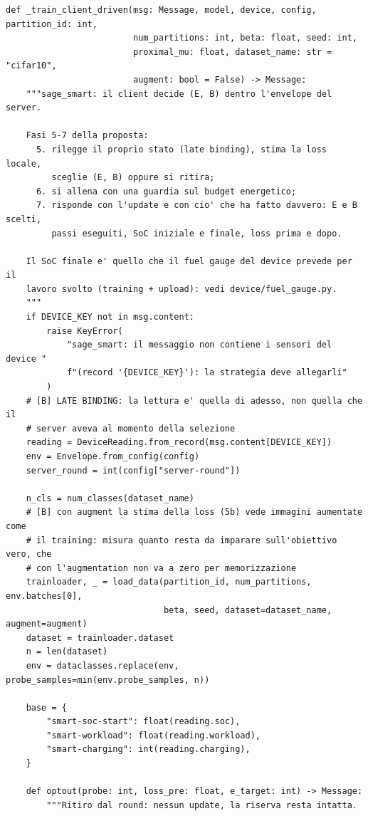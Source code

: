 \documentclass[11pt,a4paper]{article}
\begin{document}
\begin{lstlisting}[style=py,firstnumber=141,caption={\texttt{tesifl/tesiFL/client\_app.py}, lines 141--276}]
def _train_client_driven(msg: Message, model, device, config, partition_id: int,
                         num_partitions: int, beta: float, seed: int,
                         proximal_mu: float, dataset_name: str = "cifar10",
                         augment: bool = False) -> Message:
    """sage_smart: il client decide (E, B) dentro l'envelope del server.

    Fasi 5-7 della proposta:
      5. rilegge il proprio stato (late binding), stima la loss locale,
         sceglie (E, B) oppure si ritira;
      6. si allena con una guardia sul budget energetico;
      7. risponde con l'update e con cio' che ha fatto davvero: E e B scelti,
         passi eseguiti, SoC iniziale e finale, loss prima e dopo.

    Il SoC finale e' quello che il fuel gauge del device prevede per il
    lavoro svolto (training + upload): vedi device/fuel_gauge.py.
    """
    if DEVICE_KEY not in msg.content:
        raise KeyError(
            "sage_smart: il messaggio non contiene i sensori del device "
            f"(record '{DEVICE_KEY}'): la strategia deve allegarli"
        )
    # [B] LATE BINDING: la lettura e' quella di adesso, non quella che il
    # server aveva al momento della selezione
    reading = DeviceReading.from_record(msg.content[DEVICE_KEY])
    env = Envelope.from_config(config)
    server_round = int(config["server-round"])

    n_cls = num_classes(dataset_name)
    # [B] con augment la stima della loss (5b) vede immagini aumentate come
    # il training: misura quanto resta da imparare sull'obiettivo vero, che
    # con l'augmentation non va a zero per memorizzazione
    trainloader, _ = load_data(partition_id, num_partitions, env.batches[0],
                               beta, seed, dataset=dataset_name, augment=augment)
    dataset = trainloader.dataset
    n = len(dataset)
    env = dataclasses.replace(env, probe_samples=min(env.probe_samples, n))

    base = {
        "smart-soc-start": float(reading.soc),
        "smart-workload": float(reading.workload),
        "smart-charging": int(reading.charging),
    }

    def optout(probe: int, loss_pre: float, e_target: int) -> Message:
        """Ritiro dal round: nessun update, la riserva resta intatta.


\end{lstlisting}
\end{document}
